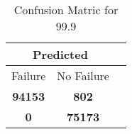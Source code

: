 \begin{table}[] 
\caption{Confusion Matric for 99.9} 
\label{Table: Prediction Accuracy-DMD99.9OnlySunEKF-combinationReflectionEKF-top2perfectNoFailurePrediction-Reflection} 
\centering 
\begin{tabular} 
 {@{}ccc@{}} 
\toprule 
\multicolumn{2}{c}{\textbf{Predicted}}
 \\ \midrule 
\multicolumn{1}{|c|}{Failure} & 
\multicolumn{1}{c|}{No Failure}
 \\ \midrule 
\multicolumn{1}{|c|}{\color{green}\textbf{94153}} & 
\multicolumn{1}{c|}{\color{red}\textbf{802}}
 \\ \midrule 
\multicolumn{1}{|c|}{\color{red}\textbf{0}} & 
\multicolumn{1}{c|}{\color{green}\textbf{75173}}
 \\ \bottomrule 
\end{tabular} 
\end{table} 
